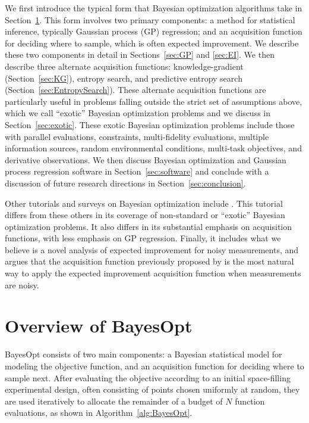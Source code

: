 \documentclass{article}
\begin{document}
We first introduce the typical form that Bayesian optimization algorithms take in Section~\ref{sec:overview}.  This form involves two primary components: a method for statistical inference, typically Gaussian process (GP) regression; and an acquisition function for deciding where to sample, which is often expected improvement.  We describe these two components in detail in Sections~\ref{sec:GP} and \ref{sec:EI}.  
We then describe three alternate acquisition functions: knowledge-gradient (Section~\ref{sec:KG}), entropy search, and predictive entropy search (Section~\ref{sec:EntropySearch}). 
These alternate acquisition functions are particularly useful in problems falling outside the strict set of assumptions above, which we call ``exotic'' Bayesian optimization problems and we discuss in Section~\ref{sec:exotic}.
These exotic Bayesian optimization problems include those with parallel evaluations, constraints, multi-fidelity evaluations, multiple information sources, random environmental conditions, multi-task objectives, and derivative observations.  
We then discuss Bayesian optimization and Gaussian process regression software in Section~\ref{sec:software} and conclude with a discussion of future research directions in Section~\ref{sec:conclusion}.

Other tutorials and surveys on Bayesian optimization include \cite{shahriari2016taking,BrCoFr09,Sa02,frazier2016bayesian}.
This tutorial differs from these others in its coverage of non-standard or ``exotic'' Bayesian optimization problems.  It also differs in its substantial emphasis on acquisition functions, with less emphasis on GP regression.  Finally, it includes what we believe is a novel analysis of expected improvement for noisy measurements, and argues that the acquisition function previously proposed by \cite{ScottFrazierPowell2011} is the most natural way to apply the expected improvement acquisition function when measurements are noisy.




\section{Overview of BayesOpt}
\label{sec:overview}

BayesOpt consists of two main components: a Bayesian statistical model for modeling the objective function,
and an acquisition function for deciding where to sample next.
After evaluating the objective according to an initial space-filling experimental design, often consisting of points chosen uniformly at random, they are used iteratively to allocate the remainder of a budget of $N$ function evaluations, as shown in Algorithm~\ref{alg:BayesOpt}.
\end{document}
